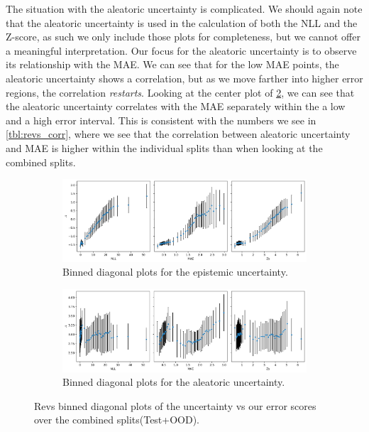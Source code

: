 The situation with the aleatoric uncertainty is complicated. We should again note that the aleatoric uncertainty is used in the calculation of both the NLL and the Z-score, as such we only include those plots for completeness, but we cannot offer a meaningful interpretation. Our focus for the aleatoric uncertainty is to observe its relationship with the MAE. We can see that for the low MAE points, the aleatoric uncertainty shows a correlation, but as we move farther into higher error regions, the correlation \emph{restarts}. Looking at the center plot of \cref{fig:revs_aleatoric_corr}, we can see that the aleatoric uncertainty correlates with the MAE separately within the a low and a high error interval. This is consistent with the numbers we see in \cref{tbl:revs_corr}, where we see that the correlation between aleatoric uncertainty and MAE is higher within the individual splits than when looking at the combined splits.

\begin{figure}[htbp]
  \centering
    \begin{subfigure}[b]{\textwidth}
        \includegraphics[width=\textwidth]{Experiments/figs/revs_epistemic_errors_corr.png}
        \caption{Binned diagonal plots for the epistemic uncertainty.}
        \label{fig:revs_epistemic_corr}
    \end{subfigure}
    
    \begin{subfigure}[b]{\textwidth}
        \includegraphics[width=\textwidth]{Experiments/figs/revs_aleatoric_errors_corr.png}
        \caption{Binned diagonal plots for the aleatoric uncertainty.}
    \label{fig:revs_aleatoric_corr}
  \end{subfigure}
    \caption{Revs binned diagonal plots of the  uncertainty vs our error scores over the combined splits(Test+OOD).}
    \label{fig:revs_uncertainty_corr}
\end{figure}


